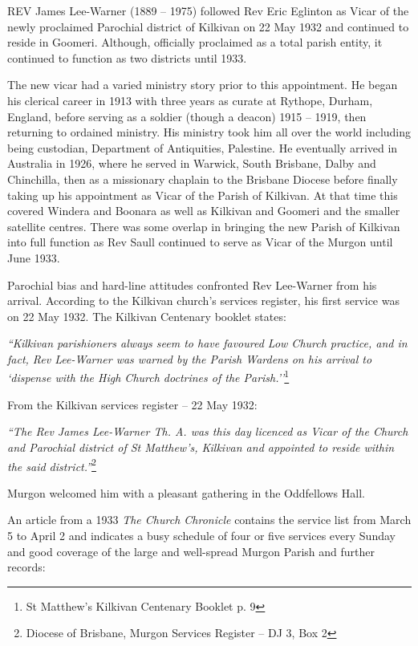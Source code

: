 \lettrine[lines=3]{R}{EV}
 James Lee-Warner (1889 -- 1975) followed Rev Eric Eglinton as Vicar of the newly proclaimed Parochial district of Kilkivan on 22 May 1932 and continued to reside in Goomeri. Although, officially proclaimed as a total parish entity, it continued to function as two districts until 1933.

The new vicar had a varied ministry story prior to this appointment. He began his clerical career in 1913 with three years as curate at Rythope, Durham, England, before serving as a soldier (though a deacon) 1915 -- 1919, then returning to ordained ministry. His ministry took him all over the world including being custodian, Department of Antiquities, Palestine. He eventually arrived in Australia in 1926, where he served in Warwick, South Brisbane, Dalby and Chinchilla, then as a missionary chaplain to the Brisbane Diocese before finally taking up his appointment as Vicar of the Parish of Kilkivan. At that time this covered Windera and Boonara as well as Kilkivan and Goomeri and the smaller satellite centres. There was some overlap in bringing the new Parish of Kilkivan into full function as Rev Saull continued to serve as Vicar of the Murgon until June 1933.



Parochial bias and hard-line attitudes confronted Rev Lee-Warner from his arrival. According to the Kilkivan church's services register, his first service was on 22 May 1932. The Kilkivan Centenary booklet states:



\emph{``Kilkivan parishioners always seem to have favoured Low Church practice, and in fact, Rev Lee-Warner was warned by the Parish Wardens on his arrival to `dispense with the High Church doctrines of the Parish.''}\footnote{St Matthew's Kilkivan Centenary Booklet p. 9}


From the Kilkivan services register -- 22 May 1932:



\emph{``The Rev James Lee-Warner Th. A. was this day licenced as Vicar of the Church and Parochial district of St Matthew's, Kilkivan and appointed to reside within the said district.''}\footnote{Diocese of Brisbane, Murgon Services Register -- DJ 3, Box 2}


Murgon welcomed him with a pleasant gathering in the Oddfellows Hall.



An article from a 1933 \emph{The Church Chronicle} contains the service list from March 5 to April 2 and indicates a busy schedule of four or five services every Sunday and good coverage of the large and well-spread Murgon Parish and further records:



